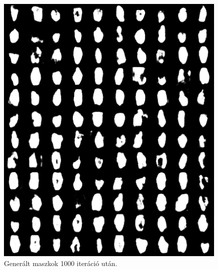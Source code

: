 \documentclass[12pt,a4]{article}
\begin{document}
        \begin{figure}[h!]
          \centering
          \begin{minipage}[b]{0.4\textwidth}
            \includegraphics[width=\textwidth]{test-masks-1000.png}
            \caption{Generált maszkok 1000 iteráció után.}
            \label{fig:masks-1000it}
          \end{minipage}
          \hfill
          \begin{minipage}[b]{0.4\textwidth}

\end{minipage}
\end{figure}
\end{document}
